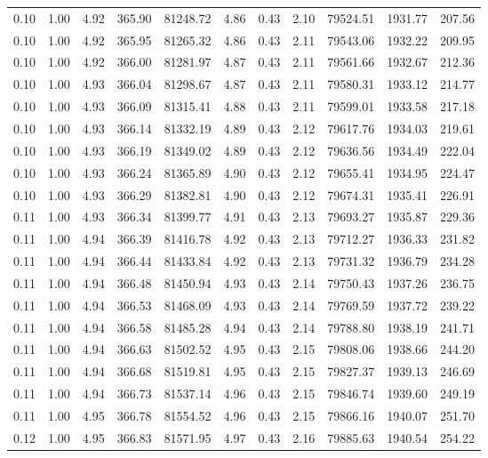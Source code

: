 \begin{table}[!ht]
\begin{tabular}{rrrrrrrrrrr}
0.10 & 1.00 & 4.92 & 365.90 & 81248.72 & 4.86 & 0.43 & 2.10 & 79524.51 & 1931.77 & 207.56 \\
0.10 & 1.00 & 4.92 & 365.95 & 81265.32 & 4.86 & 0.43 & 2.11 & 79543.06 & 1932.22 & 209.95 \\
0.10 & 1.00 & 4.92 & 366.00 & 81281.97 & 4.87 & 0.43 & 2.11 & 79561.66 & 1932.67 & 212.36 \\
0.10 & 1.00 & 4.93 & 366.04 & 81298.67 & 4.87 & 0.43 & 2.11 & 79580.31 & 1933.12 & 214.77 \\
0.10 & 1.00 & 4.93 & 366.09 & 81315.41 & 4.88 & 0.43 & 2.11 & 79599.01 & 1933.58 & 217.18 \\
0.10 & 1.00 & 4.93 & 366.14 & 81332.19 & 4.89 & 0.43 & 2.12 & 79617.76 & 1934.03 & 219.61 \\
0.10 & 1.00 & 4.93 & 366.19 & 81349.02 & 4.89 & 0.43 & 2.12 & 79636.56 & 1934.49 & 222.04 \\
0.10 & 1.00 & 4.93 & 366.24 & 81365.89 & 4.90 & 0.43 & 2.12 & 79655.41 & 1934.95 & 224.47 \\
0.10 & 1.00 & 4.93 & 366.29 & 81382.81 & 4.90 & 0.43 & 2.12 & 79674.31 & 1935.41 & 226.91 \\
0.11 & 1.00 & 4.93 & 366.34 & 81399.77 & 4.91 & 0.43 & 2.13 & 79693.27 & 1935.87 & 229.36 \\
0.11 & 1.00 & 4.94 & 366.39 & 81416.78 & 4.92 & 0.43 & 2.13 & 79712.27 & 1936.33 & 231.82 \\
0.11 & 1.00 & 4.94 & 366.44 & 81433.84 & 4.92 & 0.43 & 2.13 & 79731.32 & 1936.79 & 234.28 \\
0.11 & 1.00 & 4.94 & 366.48 & 81450.94 & 4.93 & 0.43 & 2.14 & 79750.43 & 1937.26 & 236.75 \\
0.11 & 1.00 & 4.94 & 366.53 & 81468.09 & 4.93 & 0.43 & 2.14 & 79769.59 & 1937.72 & 239.22 \\
0.11 & 1.00 & 4.94 & 366.58 & 81485.28 & 4.94 & 0.43 & 2.14 & 79788.80 & 1938.19 & 241.71 \\
0.11 & 1.00 & 4.94 & 366.63 & 81502.52 & 4.95 & 0.43 & 2.15 & 79808.06 & 1938.66 & 244.20 \\
0.11 & 1.00 & 4.94 & 366.68 & 81519.81 & 4.95 & 0.43 & 2.15 & 79827.37 & 1939.13 & 246.69 \\
0.11 & 1.00 & 4.94 & 366.73 & 81537.14 & 4.96 & 0.43 & 2.15 & 79846.74 & 1939.60 & 249.19 \\
0.11 & 1.00 & 4.95 & 366.78 & 81554.52 & 4.96 & 0.43 & 2.15 & 79866.16 & 1940.07 & 251.70 \\
0.12 & 1.00 & 4.95 & 366.83 & 81571.95 & 4.97 & 0.43 & 2.16 & 79885.63 & 1940.54 & 254.22 \\

\end{tabular}
\end{table}
